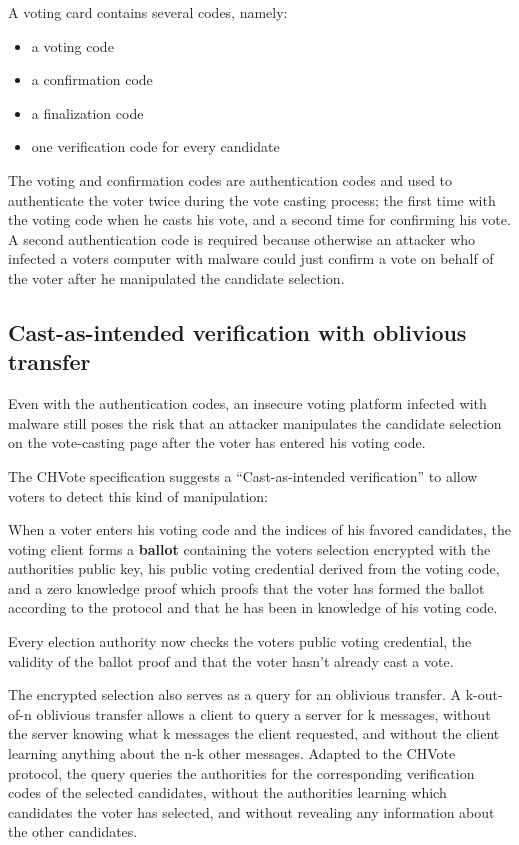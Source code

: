 A voting card contains several codes, namely:

\begin{itemize}
	\item a voting code
	\item a confirmation code
	\item a finalization code
	\item one verification code for every candidate
\end{itemize}

The voting and confirmation codes are authentication codes and used to authenticate the voter twice during the vote casting process; the first time with the voting code when he casts his vote, and a second time for confirming his vote. A second authentication code is required because otherwise an attacker who infected a voters computer with malware could just confirm a vote on behalf of the voter after he manipulated the candidate selection. 

\subsection{Cast-as-intended verification with oblivious transfer}

Even with the authentication codes, an insecure voting platform infected with malware still poses the risk that an attacker manipulates the candidate selection on the vote-casting page after the voter has entered his voting code. 

The CHVote specification suggests a "`Cast-as-intended verification"' to allow voters to detect this kind of manipulation:

When a voter enters his voting code and the indices of his favored candidates, the voting client forms a \textbf{ballot} containing the voters selection encrypted with the authorities public key, his public voting credential derived from the voting code, and a zero knowledge proof which proofs that the voter has formed the ballot according to the protocol and that he has been in knowledge of his voting code.

Every election authority now checks the voters public voting credential, the validity of the ballot proof and that the voter hasn't already cast a vote. 

The encrypted selection also serves as a query for an oblivious transfer. A k-out-of-n oblivious transfer allows a client to query a server for k messages, without the server knowing what k messages the client requested, and without the client learning anything about the n-k other messages. Adapted to the CHVote protocol, the query queries the authorities for the corresponding verification codes of the selected candidates, without the authorities learning which candidates the voter has selected, and without revealing any information about the other candidates. 

